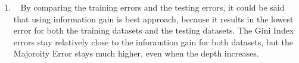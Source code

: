 \documentclass[12pt, fullpage,letterpaper]{article}
\begin{document}
\begin{enumerate}
\begin{enumerate}
\item~
\newline By comparing the training errors and the testing errors, it could be said that using information gain is best approach, because it results in the lowest error for both the training datasets and the testing datasets. The Gini Index errors stay relatively close to the inforamtion gain for both datasets, but the Majoroity Error stays much higher, even when the depth increases.
\newline
\newline
\newline
\newline
\newline
\newline
\newline
\newline
\newline
\newline
\newline
\newline
\newline
\newline
\newline
\end{enumerate}



\end{enumerate}
\end{document}

